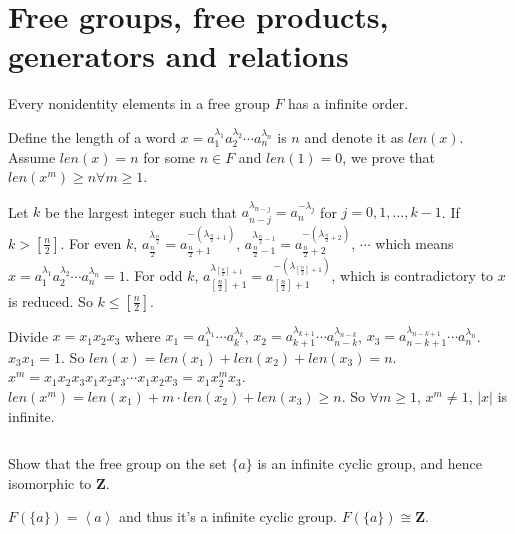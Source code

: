 \section{Free groups, free products, generators and relations}
\begin{ex}
    Every nonidentity elements in a free group $F$ has a infinite order.
\end{ex}

\begin{answer}
    Define the length of a word $x=a_{1}^{\lambda_{1}}a_{2}^{\lambda_{2}}\cdots a_{n}^{\lambda_{n}}$ is $n$ and denote it as $len(x)$. Assume $len(x)=n$ for some $n\in F$ and $len(1)=0$, we prove that $len(x^{m})\geq n\forall m\geq 1$.

    Let $k$ be the largest integer such that  $a_{n-j}^{\lambda_{n-j}}=a_{n}^{-\lambda_{j}}$ for $j=0, 1, \dots, k-1$. If $k>\left[\frac{n}{2}\right]$. For even $k$, $a_{\frac{n}{2}}^{\lambda_{\frac{n}{2}}}=a_{\frac{n}{2}+1}^{-(\lambda_{\frac{n}{2}+1})}$, $a_{\frac{n}{2}-1}^{\lambda_{\frac{n}{2}-1}}=a_{\frac{n}{2}+2}^{-(\lambda_{\frac{n}{2}+2})}$, $\cdots$ which means $x=a_{1}^{\lambda_{1}}a_{2}^{\lambda_{2}}\cdots a_{n}^{\lambda_{n}}=1$. For odd $k$, $a_{\left[\frac{n}{2}\right]+1}^{\lambda_{\left[\frac{n}{2}\right]+1}}=a_{\left[\frac{n}{2}\right]+1}^{-(\lambda_{\left[\frac{n}{2}\right]+1})}$, which is contradictory to $x$ is reduced. So $k\leq \left[\frac{n}{2}\right]$.

    Divide $x=x_{1}x_{2}x_{3}$ where $x_{1}=a_{1}^{\lambda_{1}}\cdots a_{k}^{\lambda_{k}}$, $x_{2}=a_{k+1}^{\lambda_{k+1}}\cdots a_{n-k}^{\lambda_{n-k}}$, $x_{3}=a_{n-k+1}^{\lambda_{n-k+1}}\cdots a_{n}^{\lambda_{n}}$. $x_{3}x_{1}=1$. So $len(x)=len(x_{1})+len(x_{2})+len(x_{3})=n$. $x^{m}=x_{1}x_{2}x_{3}x_{1}x_{2}x_{3}\cdots x_{1}x_{2}x_{3}=x_{1}x_{2}^{m}x_{3}$. $len(x^{m})=len(x_{1})+m\cdot len(x_{2})+len(x_{3})\geq n$. So $\forall m\geq 1$, $x^{m}\neq 1$, $\left| x \right| $ is infinite.
\end{answer}

$$ $$

\begin{ex}
    Show that the free group on the set $\{a\}$ is an infinite cyclic group, and hence isomorphic to $\mathbf{Z}$.
\end{ex}

\begin{answer}
    $F(\{a\})=\left\langle a\right\rangle$ and thus it's a infinite cyclic group. $F(\{a\})\cong \mathbf{Z}$.
\end{answer}

